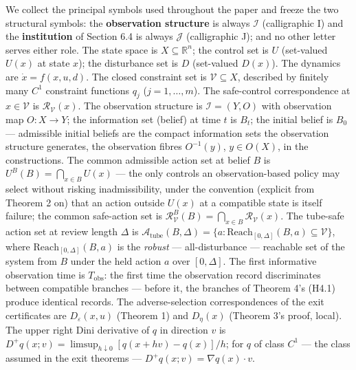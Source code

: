 \documentclass[11pt]{article}
\begin{document}
We collect the principal symbols used throughout the paper and freeze
the two structural symbols: the \textbf{observation structure} is always
\(\mathcal{I}\) (calligraphic I) and the \textbf{institution} of Section
6.4 is always \(\mathcal{J}\) (calligraphic J); and no other letter
serves either role. The state space is \(X \subseteq \mathbb{R}^n\); the
control set is \(U\) (set-valued \(U(x)\) at state \(x\)); the
disturbance set is \(D\) (set-valued \(D(x)\)). The dynamics are
\(\dot x = f(x,u,d)\). The closed constraint set is
\(\mathcal{V} \subseteq X\), described by finitely many \(C^1\)
constraint functions \(q_j\) (\(j = 1,\ldots,m\)). The safe-control
correspondence at \(x \in \mathcal{V}\) is
\(\mathcal{R}_{\mathcal{V}}(x)\). The observation structure is
\(\mathcal{I} = (Y, O)\) with observation map \(O : X \to Y\); the
information set (belief) at time \(t\) is \(B_t\); the initial belief is
\(B_0\) --- admissible initial beliefs are the compact information sets
the observation structure generates, the observation fibres
\(O^{-1}(y)\), \(y \in O(X)\), in the constructions. The common
admissible action set at belief \(B\) is
\(U^B(B) = \bigcap_{x \in B} U(x)\) --- the only controls an
observation-based policy may select without risking inadmissibility,
under the convention (explicit from Theorem 2 on) that an action outside
\(U(x)\) at a compatible state is itself failure; the common safe-action
set is
\(\mathcal{R}_{\mathcal{V}}^B(B) = \bigcap_{x \in B} \mathcal{R}_{\mathcal{V}}(x)\).
The tube-safe action set at review length \(\Delta\) is
\(\mathcal{A}_{\mathrm{tube}}(B, \Delta) = \{ a : \mathrm{Reach}_{[0,\Delta]}(B, a) \subseteq \mathcal{V} \}\),
where \(\mathrm{Reach}_{[0,\Delta]}(B, a)\) is the \emph{robust} ---
all-disturbance --- reachable set of the system from \(B\) under the
held action \(a\) over \([0,\Delta]\). The first informative observation
time is \(T_{\mathrm{obs}}\): the first time the observation record
discriminates between compatible branches --- before it, the branches of
Theorem 4's (H4.1) produce identical records. The adverse-selection
correspondences of the exit certificates are \(D_{\varepsilon}(x, u)\)
(Theorem 1) and \(D_{\eta}(x)\) (Theorem 3's proof, local). The upper
right Dini derivative of \(q\) in direction \(v\) is
\(D^+ q(x; v) = \limsup_{h \downarrow 0} [q(x + hv) - q(x)]/h\); for
\(q\) of class \(C^1\) --- the class assumed in the exit theorems ---
\(D^+ q(x; v) = \nabla q(x) \cdot v\).
\end{document}
